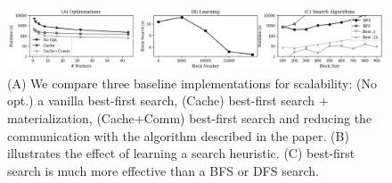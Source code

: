  \begin{figure}[ht]
\centering
 \includegraphics[width=\textwidth]{exp/exp6.png}
 \caption{(A) We compare three baseline implementations for scalability: (No opt.) a vanilla best-first search, (Cache) best-first search + materialization, (Cache+Comm) best-first search and reducing the communication with the algorithm described in the paper. (B) illustrates the effect of learning a search heuristic. (C) best-first search is much more effective than a BFS or DFS search.  
 \label{fig:opt}}
\end{figure}
